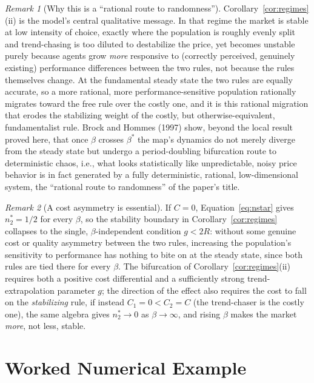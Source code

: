\documentclass[11pt]{article}
\theoremstyle{remark}
\newtheorem*{remark}{Remark}
\theoremstyle{definition}
\begin{document}
\begin{remark}[Why this is a ``rational route to randomness'']
Corollary~\ref{cor:regimes}(ii) is the model's central qualitative message. In that regime the market is stable at low intensity of choice, exactly where the population is roughly evenly split and trend-chasing is too diluted to destabilize the price, yet becomes unstable purely because agents grow \emph{more} responsive to (correctly perceived, genuinely existing) performance differences between the two rules, not because the rules themselves change. At the fundamental steady state the two rules are equally accurate, so a more rational, more performance-sensitive population rationally migrates toward the free rule over the costly one, and it is this rational migration that erodes the stabilizing weight of the costly, but otherwise-equivalent, fundamentalist rule. Brock and Hommes (1997) show, beyond the local result proved here, that once $\beta$ crosses $\beta^{*}$ the map's dynamics do not merely diverge from the steady state but undergo a period-doubling bifurcation route to deterministic chaos, i.e., what looks statistically like unpredictable, noisy price behavior is in fact generated by a fully deterministic, rational, low-dimensional system, the ``rational route to randomness'' of the paper's title.
\end{remark}

\begin{remark}[A cost asymmetry is essential]
If $C=0$, Equation~\eqref{eq:nstar} gives $n_2^{*}=1/2$ for every $\beta$, so the stability boundary in Corollary~\ref{cor:regimes} collapses to the single, $\beta$-independent condition $g<2R$: without some genuine cost or quality asymmetry between the two rules, increasing the population's sensitivity to performance has nothing to bite on at the steady state, since both rules are tied there for every $\beta$. The bifurcation of Corollary~\ref{cor:regimes}(ii) requires both a positive cost differential and a sufficiently strong trend-extrapolation parameter $g$; the direction of the effect also requires the cost to fall on the \emph{stabilizing} rule, if instead $C_1=0<C_2=C$ (the trend-chaser is the costly one), the same algebra gives $n_2^{*}\to0$ as $\beta\to\infty$, and rising $\beta$ makes the market \emph{more}, not less, stable.
\end{remark}

\section{Worked Numerical Example}
\label{sec:example}
\end{document}
